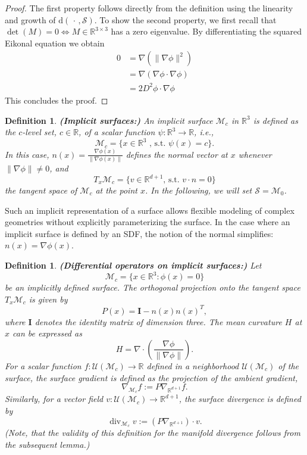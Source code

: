 \documentclass[draft,12pt,openany]{book}
\newcommand{\R}{\mathbb{R}}
\def\S{\mathcal{S}}
\theoremstyle{plainnormal}
\newtheorem{definition}[theorem]{Definition}
\theoremstyle{remark}
\begin{document}
\begin{proof}
    The first property follows directly from the definition using the linearity and growth of $\mathrm{d}(\,\cdot\,, \S)$. To show the second property, we first recall that {$\det(M) = 0 \Leftrightarrow M\in\R^{3\times3}$} has a zero eigenvalue. By differentiating the squared Eikonal equation we obtain
    \begin{align*}
        0 &= \nabla(\|\nabla \phi\|^2)\\
        &= \nabla ( \nabla \phi \cdot \nabla\phi)\\
        &= 2 D^2 \phi \cdot \nabla\phi
    \end{align*} 
    This concludes the proof.
\end{proof}
\begin{definition}\textbf{(Implicit surfaces:)}
    An \emph{implicit surface} $\mathcal{M}_c$ in $\R^3$ is defined as the $c$-level set, $c\in \R$, of a scalar function $\psi: \R^3\rightarrow\R$, i.e.,
$$\mathcal M_c=\{x\in\R^3 \text{ , s.t. } \psi(x)=c\}.$$
    In this case, $n(x) = \frac{\nabla \phi(x)}{\|\nabla \phi(x)\|}$ defines the normal vector at $x$ whenever $\|\nabla \phi\| \ne 0$, and $$T_x\mathcal{M}_c = \{v\in \R^{d+1} \text{, s.t. } v\cdot n = 0\}$$ the tangent space of $\mathcal{M}_c$ at the point $x$. In the following, we will set $\S = \mathcal{M}_0$.
\end{definition}
Such an implicit representation of a surface allows flexible modeling of complex geometries without explicitly parameterizing the surface. In the case where an implicit surface is defined by an SDF, the notion of the normal simplifies: $n(x) = {\nabla \phi(x)}$.  
\begin{definition}\label{def:diff_ops_implicit_surface}\textbf{(Differential operators on implicit surfaces:)} Let $$\mathcal{M}_c = \{ x \in \mathbb{R}^{3} : \phi(x) = 0 \}$$ be an implicitly defined surface. 
The \emph{orthogonal projection} onto the tangent space \(T_x \mathcal{M}_c\) is given by
\[
P(x) = \mathbf I - n(x) n(x)^T,
\]
where \(\mathbf I\) denotes the identity matrix of dimension three.
The \emph{mean curvature} \(H\) at \(x\) can be expressed as
\[
H =  \nabla \cdot \left( \frac{\nabla \phi}{\|\nabla \phi\|} \right).
\]
For a scalar function \(f : \mathcal{U}(\mathcal{M}_c) \to \mathbb{R}\) defined in a neighborhood \(\mathcal{U}(\mathcal{M}_c)\) of the surface, the \emph{surface gradient} is defined as the projection of the ambient gradient,
\[
\nabla_{\mathcal{M}_c} f := P \nabla_{\mathbb{R}^{d+1}} f.
\]
Similarly, for a vector field \(v : \mathcal{U}(\mathcal{M}_c) \to \mathbb{R}^{d+1}\), the \emph{surface divergence} is defined by
\[
\operatorname{div}_{\mathcal{M}_c} v :=  (P \nabla_{\mathbb{R}^{d+1}}) \cdot v.
\]
(Note, that the validity of this definition for the manifold divergence follows from the subsequent lemma.)
\end{definition}
\end{document}

